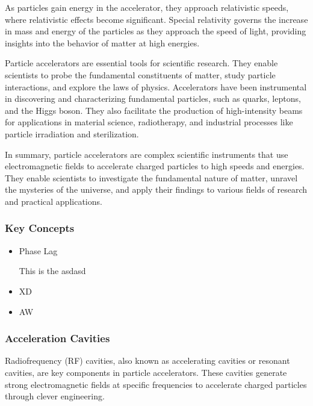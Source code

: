 \documentclass{article}
\begin{document}
As particles gain energy in the accelerator, they approach relativistic speeds, where relativistic effects become significant. 
Special relativity governs the increase in mass and energy of the particles as they approach the speed of light, providing insights into the behavior of matter at high energies.

Particle accelerators are essential tools for scientific research. They enable scientists to probe the fundamental constituents of matter, study particle interactions, and explore the laws of physics. 
Accelerators have been instrumental in discovering and characterizing fundamental particles, such as quarks, leptons, and the Higgs boson. 
They also facilitate the production of high-intensity beams for applications in material science, radiotherapy, and industrial processes like particle irradiation and sterilization.

In summary, particle accelerators are complex scientific instruments that use electromagnetic fields to accelerate charged particles to high speeds and energies. 
They enable scientists to investigate the fundamental nature of matter, unravel the mysteries of the universe, and apply their findings to various fields of research and practical applications.


\subsubsection{Key Concepts}

\begin{itemize}
    \item Phase Lag
    
    This is the asdasd

    \item XD
    \item AW
    
    
\end{itemize}

\subsubsection{Acceleration Cavities}
Radiofrequency (RF) cavities, also known as accelerating cavities or resonant cavities, are key components in particle accelerators. 
These cavities generate strong electromagnetic fields at specific frequencies to accelerate charged particles through clever engineering.
\end{document}
